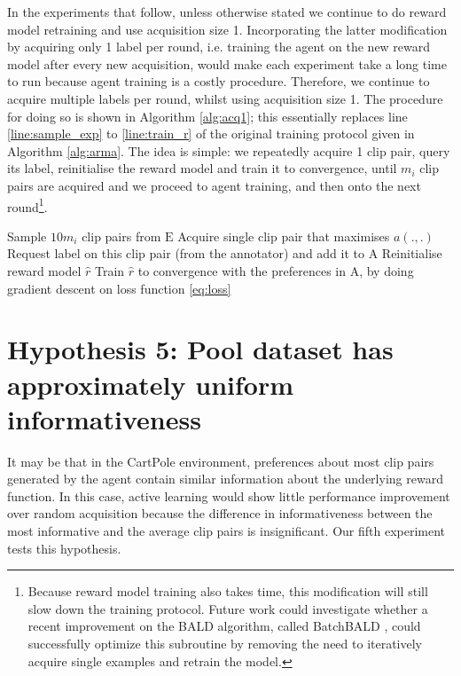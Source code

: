 \documentclass[11pt, a4paper, bibliography=totoc]{report}
\newcommand{\rp}{\hat{r}}
\newcommand{\expbuff}{\mathrm{E}}
\newcommand{\annbuff}{\mathrm{A}}
\begin{document}
In the experiments that follow, unless otherwise stated we continue to do reward model retraining and use acquisition size 1. Incorporating the latter modification by acquiring only 1 label per round, i.e. training the agent on the new reward model after every new acquisition, would make each experiment take a long time to run because agent training is a costly procedure. Therefore, we continue to acquire multiple labels per round, whilst using acquisition size 1. The procedure for doing so is shown in Algorithm \ref{alg:acq1}; this essentially replaces line \ref{line:sample_exp} to \ref{line:train_r} of the original training protocol given in Algorithm \ref{alg:arma}. The idea is simple: we repeatedly acquire 1 clip pair, query its label, reinitialise the reward model and train it to convergence, until $ m_i $ clip pairs are acquired and we proceed to agent training, and then onto the next round\footnote{Because reward model training also takes time, this modification will still slow down the training protocol. Future work could investigate whether a recent improvement on the BALD algorithm, called BatchBALD \cite{Kirsch2019a}, could successfully optimize this subroutine by removing the need to iteratively acquire single examples and retrain the model.}.
\begin{algorithm}
	\caption{Acquiring a batch of clip pairs with acquisition size 1.}
	\label{alg:acq1}
	\begin{algorithmic}[1]
		\State Sample $ 10m_i $ clip pairs from $ \expbuff $ \label{line:sample_exp2}
		\Repeat
		\State Acquire single clip pair that maximises $ a(.,.) $ \label{line:acq2}
		\State Request label on this clip pair (from the annotator) and add it to $ \annbuff $
		\State Reinitialise reward model $ \rp $
		\State Train $ \rp $ to convergence with the preferences in $ \annbuff $, by doing gradient descent on loss function \ref{eq:loss}
	\end{algorithmic}
\end{algorithm}

\section{Hypothesis 5: Pool dataset has approximately uniform informativeness}
It may be that in the CartPole environment, preferences about most clip pairs generated by the agent contain similar information about the underlying reward function. In this case, active learning would show little performance improvement over random acquisition because the difference in informativeness between the most informative and the average clip pairs is insignificant. Our fifth experiment tests this hypothesis.
\end{document}

